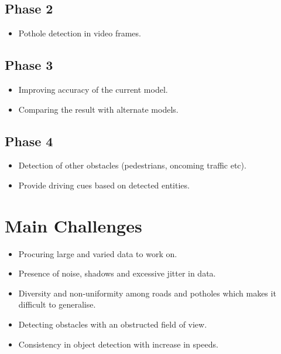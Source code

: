 \documentclass[12pt,a4paper]{article}
\begin{document}
\subsection{Phase 2} 
\begin{itemize}
\item Pothole detection in video frames.
\end{itemize}


\subsection{Phase 3}
\begin{itemize}
\item Improving accuracy of the current model.
\item Comparing the result with alternate models.
\end{itemize}


\subsection{Phase 4}
\begin{itemize}
\item Detection of other obstacles (pedestrians, oncoming traffic etc).
\item Provide driving cues based on detected entities. 
\end{itemize}



\section{Main Challenges}
\begin{itemize}
\item Procuring large and varied data to work on.

\item Presence of noise, shadows and excessive jitter in data.

\item Diversity and non-uniformity among roads and potholes which makes it difficult to generalise. 

\item Detecting obstacles with an obstructed field of view.

\item Consistency in object detection with increase in speeds.
\end{itemize}
\end{document}
